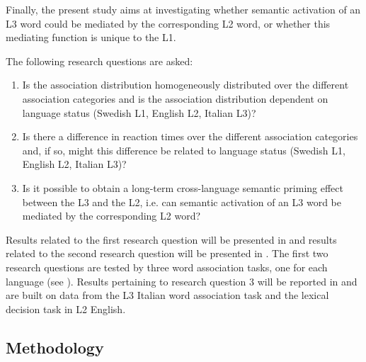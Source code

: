 \documentclass[output=paper,colorlinks,citecolor=brown,nonflat]{langsci/langscibook}
\begin{document}
Finally, the present study aims at investigating whether semantic activation of an L3 word could be mediated by the corresponding L2 word, or whether this mediating function is unique to the L1.

The following research questions are asked:

\begin{enumerate}
\item Is the association distribution homogeneously distributed over the different association categories and is the association distribution dependent on language status (Swedish L1, English L2, Italian L3)?
\item Is there a difference in reaction times over the different association categories and, if so, might this difference be related to language status (Swed\-ish L1, English L2, Italian L3)?
\item Is it possible to obtain a long-term cross-language semantic priming effect between the L3 and the L2, i.e. can semantic activation of an L3 word be mediated by the corresponding L2 word?
\end{enumerate}

Results related to the first research question will be presented in  and results related to the second research question will be presented in . The first two research questions are tested by three word association tasks, one for each language (see ). Results pertaining to research question 3 will be reported in  and are built on data from the L3 Italian word association task and the lexical decision task in L2 English.

\subsection{Methodology}\label{sec:gudmundson:2.2}
\end{document}
